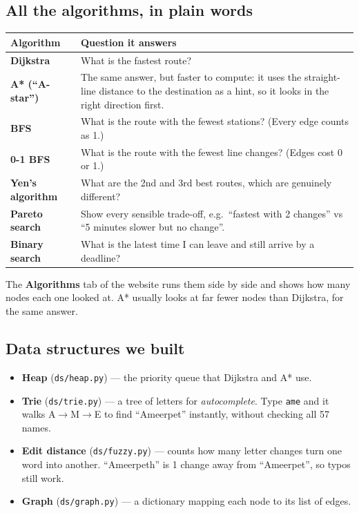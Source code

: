 \documentclass[11pt,a4paper]{article}
\newcommand{\file}[1]{\texttt{\color{accent}#1}}
\begin{document}
\subsection{All the algorithms, in plain words}

\begin{tabularx}{\linewidth}{@{}>{\bfseries}l X@{}}
\toprule
Algorithm & Question it answers \\
\midrule
Dijkstra & What is the fastest route? \\
A* (``A-star'') & The same answer, but faster to compute: it uses the straight-line distance to the destination as a hint, so it looks in the right direction first. \\
BFS & What is the route with the fewest stations? (Every edge counts as 1.) \\
0-1 BFS & What is the route with the fewest line changes? (Edges cost 0 or 1.) \\
Yen's algorithm & What are the 2nd and 3rd best routes, which are genuinely different? \\
Pareto search & Show every sensible trade-off, e.g.\ ``fastest with 2 changes'' vs ``5 minutes slower but no change''. \\
Binary search & What is the latest time I can leave and still arrive by a deadline? \\
\bottomrule
\end{tabularx}

The \textbf{Algorithms} tab of the website runs them side by side and shows how many
nodes each one looked at. A* usually looks at far fewer nodes than Dijkstra, for the same answer.

\subsection{Data structures we built}

\begin{itemize}
  \item \textbf{Heap} (\file{ds/heap.py}) --- the priority queue that Dijkstra and A* use.
  \item \textbf{Trie} (\file{ds/trie.py}) --- a tree of letters for \emph{autocomplete}.
        Type \texttt{ame} and it walks A$\rightarrow$M$\rightarrow$E to find ``Ameerpet'' instantly,
        without checking all 57 names.
  \item \textbf{Edit distance} (\file{ds/fuzzy.py}) --- counts how many letter changes turn
        one word into another. ``Ameerpeth'' is 1 change away from ``Ameerpet'', so typos still work.
  \item \textbf{Graph} (\file{ds/graph.py}) --- a dictionary mapping each node to its list of edges.
\end{itemize}
\end{document}
